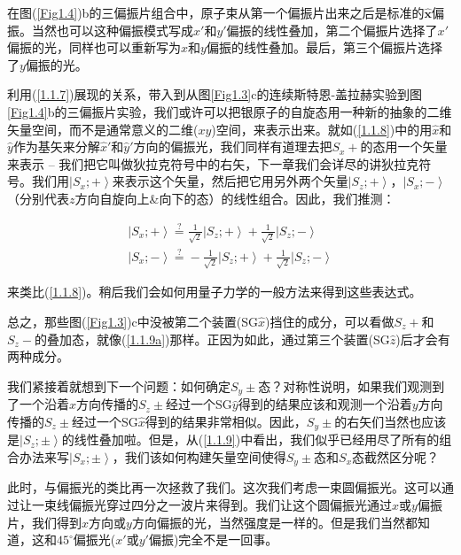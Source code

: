 \documentclass[UTF8,twoside]{ctexart}
\begin{document}
在图(\ref{Fig1.4})b的三偏振片组合中，原子束从第一个偏振片出来之后是标准的$\hat{\bm x}$偏振。当然也可以这种偏振模式写成$x'$和$y'$偏振的线性叠加，第二个偏振片选择了$x'$偏振的光，同样也可以重新写为$x$和$y$偏振的线性叠加。最后，第三个偏振片选择了$y$偏振的光。

利用(\ref{1.1.7})展现的关系，带入到从图{\ref{Fig1.3}}c的连续斯特恩-盖拉赫实验到图{\ref{Fig1.4}}b的三偏振片实验，我们或许可以把银原子的自旋态用一种新的抽象的二维矢量空间，而不是通常意义的二维($xy$)空间，来表示出来。就如(\ref{1.1.8})中的用$\hat{x}$和$\hat{y}$作为基矢来分解$\hat{x}'$和$\hat{y}'$方向的偏振光，我们同样有道理去把$S_x +$的态用一个矢量来表示 -- 我们把它叫做狄拉克符号中的右矢，下一章我们会详尽的讲狄拉克符号。我们用$\left|S_x ;+\right\rangle$来表示这个矢量，然后把它用另外两个矢量$\left|S_z ;+\right\rangle$，$\left|S_x ;-\right\rangle$（分别代表$z$方向自旋向上\&向下的态）的线性组合。因此，我们推测：

\begin{subequations} \label{1.1.9}
\begin{align}
\left|S_x ;+\right\rangle \overset{?}= \frac{1}{\sqrt{2}} \left|S_z ;+\right\rangle + \frac{1}{\sqrt{2}}\left|S_z ;-\right\rangle \label{1.1.9a}\\
\left|S_x ;-\right\rangle \overset{?}= -\frac{1}{\sqrt{2}}\left|S_z ;+\right\rangle + \frac{1}{\sqrt{2}}\left|S_z ;-\right\rangle
\end{align}
\end{subequations}

\noindent 来类比(\ref{1.1.8})。稍后我们会如何用量子力学的一般方法来得到这些表达式。

总之，那些图(\ref{Fig1.3})c中没被第二个装置(SG$\hat{x}$)挡住的成分，可以看做$S_z +$和$S_z -$的叠加态，就像(\ref{1.1.9a})那样。正因为如此，通过第三个装置(SG$\hat{z}$)后才会有两种成分。

我们紧接着就想到下一个问题：如何确定$S_y \pm$态？对称性说明，如果我们观测到了一个沿着$x$方向传播的$S_z \pm$经过一个SG$\hat{y}$得到的结果应该和观测一个沿着$y$方向传播的$S_z \pm$经过一个SG$\hat{x}$得到的结果非常相似。因此，$S_y \pm$的右矢们当然也应该是$\left|S_z; \pm\right\rangle$的线性叠加啦。但是，从(\ref{1.1.9})中看出，我们似乎已经用尽了所有的组合办法来写$\left|S_x ;\pm\right\rangle$，我们该如何构建矢量空间使得$S_y \pm$态和$S_x$态截然区分呢？

此时，与偏振光的类比再一次拯救了我们。这次我们考虑一束圆偏振光。这可以通过让一束线偏振光穿过四分之一波片来得到。我们让这个圆偏振光通过$x$或$y$偏振片，我们得到$x$方向或$y$方向偏振的光，当然强度是一样的。但是我们当然都知道，这和$45^{\circ}$偏振光($x'$或$y'$偏振)完全不是一回事。
\end{document}
